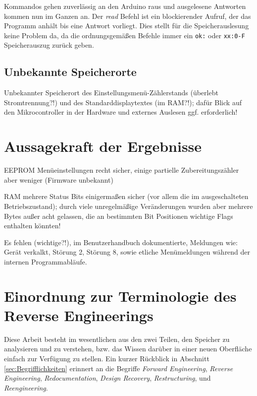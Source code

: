 Kommandos gehen zuverlässig an den Arduino raus und ausgelesene Antworten kommen nun im Ganzen an.
Der \textit{read} Befehl ist ein blockierender Aufruf, der das Programm anhält bis eine Antwort vorliegt.
Dies stellt für die Speicherauslesung keine Problem da, da die ordnungsgemäßen Befehle immer ein \texttt{ok:} oder \texttt{xx:0-F} Speicherauszug zurück geben.

\subsection{Unbekannte Speicherorte}
Unbekannter Speicherort des Einstellungsmenü-Zählerstands (überlebt Stromtrennung?!) und des Standarddisplaytextes (im RAM?!); dafür Blick auf den Mikrocontroller in der Hardware \cite{JuraMicrocontroller} und externes Auslesen ggf. erforderlich!

\section{Aussagekraft der Ergebnisse}
EEPROM Menüeinstellungen recht sicher, einige partielle Zubereitungszähler aber weniger (Firmware unbekannt)

RAM mehrere Status Bits einigermaßen sicher (vor allem die im ausgeschalteten Betriebszustand); durch viele unregelmäßige Veränderungen wurden aber mehrere Bytes außer acht gelassen, die an bestimmten Bit Positionen wichtige Flags enthalten könnten!

Es fehlen (wichtige?!), im Benutzerhandbuch dokumentierte, Meldungen wie:\label{FehlendeMeldungen}
Gerät verkalkt, Störung 2, Störung 8, sowie etliche Menümeldungen während der internen Programmabläufe.

\section{Einordnung zur Terminologie des Reverse Engineerings}\label{sec:DiskussionBegriffReverseEngineering}
Diese Arbeit besteht im wesentlichen aus den zwei Teilen, den Speicher zu analysieren und zu verstehen, bzw. das Wissen darüber in einer neuen Oberfläche einfach zur Verfügung zu stellen.
Ein kurzer Rückblick in Abschnitt \ref{sec:Begrifflichkeiten} erinnert an die Begriffe \textit{Forward Engineering}, \textit{Reverse Engineering}, \textit{Redocumentation}, \textit{Design Recovery}, \textit{Restructuring}, und \textit{Reengineering}.

